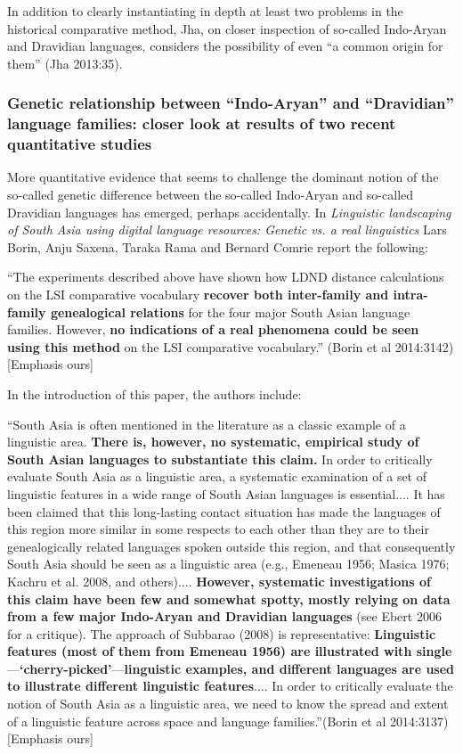 In addition to clearly instantiating in depth at least two problems in the historical comparative method, Jha, on closer inspection of so-called Indo-Aryan and Dravidian languages, considers the possibility of even “a common origin for them” (Jha 2013:35).


\subsubsection{Genetic relationship between “Indo-Aryan” and “Dravidian” language families: closer look at results of two recent quantitative studies}

More quantitative evidence that seems to challenge the dominant notion of the so-called genetic difference between the so-called Indo-Aryan and so-called Dravidian languages has emerged, perhaps accidentally. In \textit{Linguistic landscaping of South Asia using digital language resources: Genetic vs. a real linguistics} Lars Borin, Anju Saxena, Taraka Rama and Bernard Comrie report the following:

\begin{myquote}
“The experiments described above have shown how LDND distance calculations on the LSI comparative vocabulary \textbf{recover both inter-family and intra-family genealogical relations} for the four major South Asian language families. However,\textbf{ no indications of a real phenomena could be seen using this method} on the LSI comparative vocabulary.” \hfill (Borin et al 2014:3142)[Emphasis ours]
\end{myquote}

In the introduction of this paper, the authors include:

\begin{myquote}
“South Asia is often mentioned in the literature as a classic example of a linguistic area. \textbf{There is, however, no systematic, empirical study of South Asian languages to substantiate this claim.} In order to critically evaluate South Asia as a linguistic area, a systematic examination of a set of linguistic features in a wide range of South Asian languages is essential.... It has been claimed that this long-lasting contact situation has made the languages of this region more similar in some respects to each other than they are to their genealogically related languages spoken outside this region, and that consequently South Asia should be seen as a linguistic area (e.g., Emeneau 1956; Masica 1976; Kachru et al. 2008, and others).... \textbf{However, systematic investigations of this claim have been few and somewhat spotty, mostly relying on data from a few major Indo-Aryan and Dravidian languages} (see Ebert 2006 for a critique). The approach of Subbarao (2008) is representative: \textbf{Linguistic features (most of them from Emeneau 1956) are illustrated with single}—\textbf{‘cherry-picked’}—\textbf{linguistic examples, and different languages are used to illustrate different linguistic features}.... In order to critically evaluate the notion of South Asia as a linguistic area, we need to know the spread and extent of a linguistic feature across space and language families.”\hfill (Borin et al 2014:3137) [Emphasis ours]
\end{myquote}

